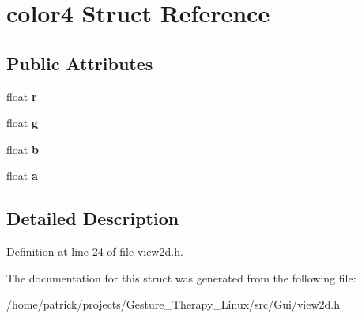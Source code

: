 \hypertarget{structcolor4}{}\section{color4 Struct Reference}
\label{structcolor4}
\subsection*{Public Attributes}
\begin{DoxyCompactItemize}
\item 
\mbox{\label{structcolor4_a44b7418ef2bfb21fef4828918ed1fd39}} 
float {\bfseries r}
\item 
\mbox{\label{structcolor4_ac2aa2da5ee05a8d1b95f387ef7b108cb}} 
float {\bfseries g}
\item 
\mbox{\label{structcolor4_a7a7c07a90bbc7d5a4ad85f7a4f0becb7}} 
float {\bfseries b}
\item 
\mbox{\label{structcolor4_a82d35f4b80197f14616dcc37f5c62700}} 
float {\bfseries a}
\end{DoxyCompactItemize}


\subsection{Detailed Description}


Definition at line 24 of file view2d.\+h.



The documentation for this struct was generated from the following file\+:\begin{DoxyCompactItemize}
\item 
/home/patrick/projects/\+Gesture\+\_\+\+Therapy\+\_\+\+Linux/src/\+Gui/view2d.\+h\end{DoxyCompactItemize}
